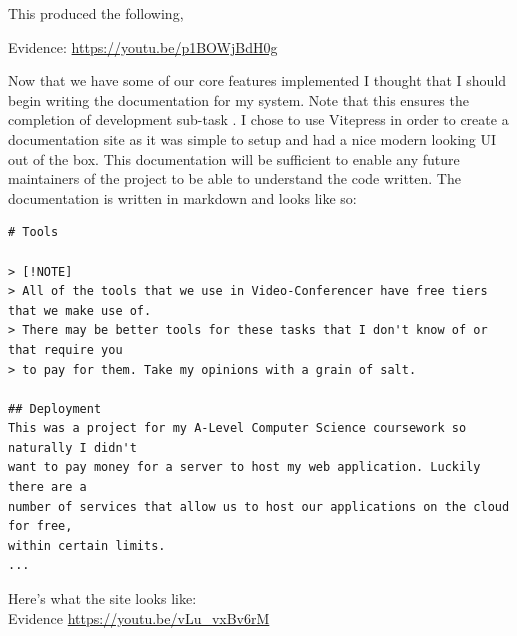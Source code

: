 This produced the following, \\ \vspace{0.2cm}

{\sffamily Evidence:} \url{https://youtu.be/p1BOWjBdH0g} \\ \vspace{0.2cm}

Now that we have some of our core features implemented I thought that I should begin writing the documentation for
my system. Note that this ensures the completion of development sub-task . I chose to use Vitepress in
order to create a documentation site as it was simple to setup and had a nice modern looking UI out of the box. This
documentation will be sufficient to enable any future maintainers of the project to be able to understand the
code written. The documentation is written in markdown and looks like so:

\begin{verbatim}
# Tools

> [!NOTE]
> All of the tools that we use in Video-Conferencer have free tiers that we make use of.
> There may be better tools for these tasks that I don't know of or that require you
> to pay for them. Take my opinions with a grain of salt.

## Deployment
This was a project for my A-Level Computer Science coursework so naturally I didn't
want to pay money for a server to host my web application. Luckily there are a
number of services that allow us to host our applications on the cloud for free,
within certain limits.
...
\end{verbatim}

Here's what the site looks like: \\ \vspace{0.2cm}
{\sffamily Evidence}  \url{https://youtu.be/vLu_vxBv6rM} \\ \vspace{0.2cm}

